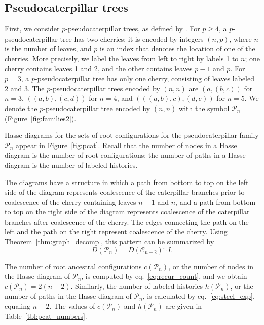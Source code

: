 \documentclass[10pt]{article}
\newcommand{\house}{\,\widehat{\square}\,}
\newcommand*{\cphat}[2]{#1 \house #2}
\begin{document}
\subsection{Pseudocaterpillar trees}\label{sec:pcat_ex}

First, we consider $p$-pseudocaterpillar trees, as defined by \cite{alimpiev2021enumeration}. For $p \geq 4$, a $p$-pseudocaterpillar tree has two cherries; it is encoded by integers $(n,p)$, where $n$ is the number of leaves, and $p$ is an index that denotes the location of one of the cherries. More precisely, we label the leaves from left to right by labels 1 to $n$; one cherry contains leaves 1 and 2, and the other contains leaves $p-1$ and $p$. For $p=3$, a $p$-pseudocaterpillar tree has only one cherry, consisting of leaves labeled 2 and 3. The $p$-pseudocaterpillar trees encoded by $(n,n)$ are $(a,(b,c))$ for $n=3$, $((a,b),(c,d))$ for $n=4$, and $(((a,b),c),(d,e))$ for $n=5$. We denote the $p$-pseudocaterpillar tree encoded by $(n,n)$ with the symbol $\mathcal P_n$ (Figure~\ref{fig:families2}).

Hasse diagrams for the sets of root configurations for the pseudocaterpillar family $\mathcal P_n$ appear in Figure~\ref{fig:pcat}. Recall that the number of nodes in a Hasse diagram is the number of root configurations; the number of paths in a Hasse diagram is the number of labeled histories.

The diagrams have a structure in which a path from bottom to top on the left side of the diagram represents coalescence of the caterpillar branches prior to coalescence of the cherry containing leaves $n-1$ and $n$, and a path from bottom to top on the right side of the diagram represents coalescence of the caterpillar branches after coalescence of the cherry. The edges connecting the path on the left and the path on the right represent coalescence of the cherry. Using Theorem~\ref{thm:graph_decomp}, this pattern can be summarized by 
\begin{equation}\label{eq:decomp_pcat}
	D(\mathcal P_n) = \cphat{D(\mathcal C_{n-2})}{I}.
\end{equation}

The number of root ancestral configurations $c(\mathcal{P}_n)$, or the number of nodes in the Hasse diagram of $\mathcal{P}_n$, is computed by eq.~\ref{eq:recur_count}, and we obtain $c(\mathcal{P}_n) = 2(n-2)$. 
Similarly, the number of labeled histories $h(\mathcal{P}_n)$, or the number of paths in the Hasse diagram of $\mathcal{P}_n$, is calculated by eq.~\ref{eq:steel_exp}, equaling $n-2$. The values of $c(\mathcal{P}_n)$ and $h(\mathcal{P}_n)$ are given in Table~\ref{tbl:pcat_numbers}.
\end{document}
